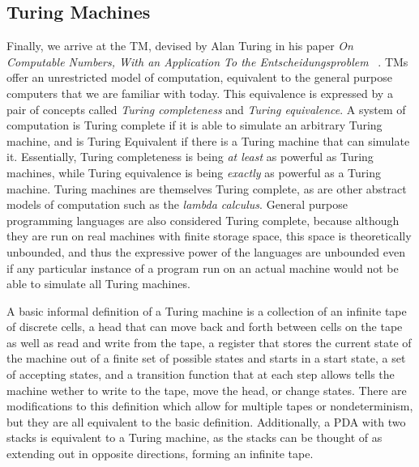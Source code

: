 \documentclass[psamsfonts]{amsart}
\theoremstyle{definition}
\theoremstyle{remark}
\numberwithin{equation}{section}
\begin{document}
\subsection{Turing Machines}
Finally, we arrive at the \ac{TM}, devised by Alan Turing in his paper \emph{On
  Computable Numbers, With an Application To the Entscheidungsproblem}
~\cite{turing37_comput_number_with_applic_to_entsc}. \aclp{TM} offer an
unrestricted model of computation, equivalent to the general purpose computers
that we are familiar with today. This equivalence is expressed by a pair of
concepts called \emph{Turing completeness} and \emph{Turing equivalence}. A
system of computation is Turing complete if it is able to simulate an arbitrary
Turing machine, and is Turing Equivalent if there is a Turing machine that can
simulate it. Essentially, Turing completeness is being \emph{at least} as
powerful as Turing machines, while Turing equivalence is being \emph{exactly} as
powerful as a Turing machine. Turing machines are themselves Turing complete, as are other
abstract models of computation such as the \emph{lambda calculus}. General
purpose programming languages are also considered Turing complete, because
although they are run on real machines with finite storage space, this space is
theoretically unbounded, and thus the expressive power of the languages are
unbounded even if any particular instance of a program run on an actual machine
would not be able to simulate all Turing machines. 
\par
A basic informal definition of a Turing machine is a collection of an infinite tape
of discrete cells,
a head that can move back and forth between cells on the tape as well as read and write
from the tape, a register that stores the current state of the machine out of a
finite set of possible states and starts in a start state, a set of accepting
states, and a transition function that at each step allows tells the machine
wether to write to the tape, move the head, or change states. There are
modifications to this definition which allow for multiple tapes or
nondeterminism, but they are all equivalent to the basic
definition. Additionally, a \ac{PDA} with two stacks is equivalent to a Turing
machine, as the stacks can be thought of as extending out in opposite
directions, forming an infinite tape.
\end{document}
